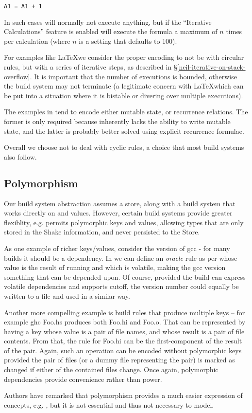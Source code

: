 \begin{verbatim}
A1 = A1 + 1
\end{verbatim}

In such cases \Excel will normally not execute anything, but if the ``Iterative Calculations'' feature is enabled will execute the formula a maximum of $n$ times per calculation (where $n$ is a setting that defaults to 100).

For examples like \LaTeX we consider the proper encoding to not be with circular rules, but with a series of iterative steps, as described in \S\ref{neil-iterative-on-stack-overflow}. It is important that the number of executions is bounded, otherwise the build system may not terminate (a legitimate concern with \LaTeX which can be put into a situation where it is bistable or divering over multiple executions).

The examples in \Excel tend to encode either mutable state, or recurrence relations. The former is only required because \Excel inherently lacks the ability to write mutable state, and the latter is probably better solved using explicit recurrence formulae.

Overall we choose not to deal with cyclic rules, a choice that most build systems also follow.

\subsection{Polymorphism}\label{sec-polymorphism}

Our build system abstraction assumes a  store, along with a build system that works directly on  and  values. However, certain build systems provide greater flexiblity, e.g. \Shake permits polymorphic keys and values, allowing types that are only stored in the Shake information, and never persisted to the Store.

As one example of richer keys/values, consider the version of \textsf{gcc} - for many builds it should be a dependency. In \Shake we can define an \textit{oracle} rule as per \cite{mitchell2012shake} whose value is the result of running  and which is volatile, making the \textsf{gcc} version something that can be depended upon. Of course, provided the build can express volatile dependencies and supports cutoff, the version number could equally be written to a file and used in a similar way.

Another more compelling example is build rules that produce multiple keys -- for example \textsf{ghc Foo.hs} produces both \textsf{Foo.hi} and \textsf{Foo.o}. That can be represented by having a key whose value is a pair of file names, and whose result is a pair of file contents. From that, the rule for \textsf{Foo.hi} can be the first-component of the result of the pair. Again, such an operation can be encoded without polymorphic keys provided the pair of files (or a dummy file representing the pair) is marked as changed if either of the contained files change. Once again, polymorphic dependencies provide convenience rather than power.

Authors have remarked that polymorphism provides a much easier expression of concepts, e.g. \citet{hadrian}, but it is not essential and thus not necessary to model.
